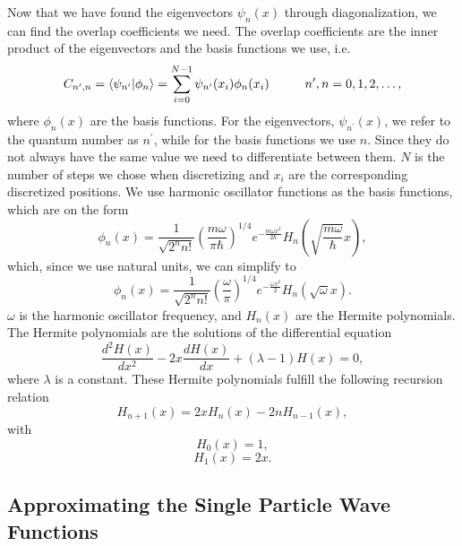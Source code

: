 \documentclass[../main.tex]{subfiles}
\begin{document}
Now that we have found the eigenvectors $\psi_n(x)$ through diagonalization, we can find the overlap coefficients we need. The overlap coefficients are the inner product of the eigenvectors and the basis functions we use, i.e.
\begin{equation}\label{eq:OverlapCoefficients}
    C_{n^\prime,n} = \langle \psi_{n^\prime} \vert \phi_n\rangle = \sum_{i=0}^{N-1} \psi_{n^\prime}(x_i)\phi_n(x_i) \hspace{1 cm} n^\prime,n = 0,1,2,\dots,
\end{equation}
where $\phi_n(x)$ are the basis functions. For the eigenvectors, $\psi_{n^\prime}(x)$, we refer to the quantum number as $n^\prime$, while for the basis functions we use $n$. Since they do not always have the same value we need to differentiate between them. $N$ is the number of steps we chose when discretizing and $x_i$ are the corresponding discretized positions. We use harmonic oscillator functions as the basis functions, which are on the form
\begin{equation}
    \phi_n(x) = \frac{1}{\sqrt{2^n n!}} \left(\frac{m\omega}{\pi\hbar}\right)^{1/4} e^{-\frac{m\omega x^2}{2\hbar}} H_n\left(\sqrt{\frac{m\omega}{\hbar}}x\right),
\end{equation}
which, since we use natural units, we can simplify to
\begin{equation}\label{eq: Basis Functions}
    \phi_n(x) = \frac{1}{\sqrt{2^n n!}} \left(\frac{\omega}{\pi}\right)^{1/4} e^{-\frac{\omega x^2}{2}} H_n\left(\sqrt{\omega}x\right).
\end{equation}
$\omega$ is the harmonic oscillator frequency, and $H_n(x)$ are the Hermite polynomials. The Hermite polynomials are the solutions of the differential equation
\begin{equation}
    \frac{d^2H(x)}{dx^2}-2x\frac{dH(x)}{dx}+(\lambda-1)H(x)=0,
\end{equation}
where $\lambda$ is a constant. These Hermite polynomials fulfill the following recursion relation
\begin{equation}
    H_{n+1}(x)=2xH_{n}(x)-2nH_{n-1}(x),
\end{equation}
with
\begin{equation}
    H_0(x) = 1,
\end{equation}
\begin{equation}
    H_1(x) = 2x.
\end{equation}



\subsection{Approximating the Single Particle Wave Functions}\label{sec:AppSPWF}
\end{document}
